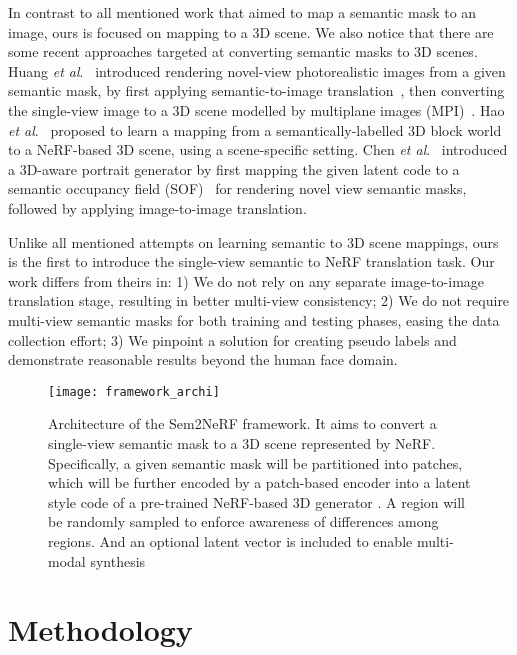 \documentclass[runningheads]{llncs}
\newcommand{\etal}{\textit{et al}.}
\begin{document}
In contrast to all mentioned work that aimed to map a semantic mask to an image, ours is focused on mapping to a 3D scene.
We also notice that there are some recent approaches targeted at converting semantic masks to 3D scenes. Huang \etal~\cite{huang2020semantic} introduced rendering novel-view photorealistic images from a given semantic mask, by first applying semantic-to-image translation~\cite{park2019semantic}, then converting the single-view image to a 3D scene modelled by multiplane images (MPI)~\cite{zhou2018stereo}.
Hao \etal~\cite{hao2021gancraft} proposed to learn a mapping from a semantically-labelled 3D block world to a NeRF-based 3D scene, using a scene-specific setting. Chen \etal~\cite{chen2022sofgan} introduced a 3D-aware portrait generator by first mapping the given latent code to a semantic occupancy field (SOF)~\cite{chen2019learning} for rendering novel view semantic masks, followed by applying image-to-image translation. 

Unlike all mentioned attempts on learning semantic to 3D scene mappings, ours is the first to introduce the single-view semantic to NeRF translation task. Our work differs from theirs in: 1) We do not rely on any separate image-to-image translation stage, resulting in better multi-view consistency; 2) We do not require multi-view semantic masks for both training and testing phases, easing the data collection effort; 3) We pinpoint a solution for creating pseudo labels and demonstrate reasonable results beyond the human face domain.  




\begin{figure}[t!]
    \centering
    \texttt{[image: framework\_archi]}
    \caption{Architecture of the Sem2NeRF framework. It aims to convert a single-view semantic mask to a 3D scene represented by NeRF. Specifically, a given semantic mask will be partitioned into patches, which will be further encoded by a patch-based encoder  into a latent style code  of a pre-trained NeRF-based 3D generator . A region  will be randomly sampled to enforce awareness of differences among regions. And an optional latent vector  is included to enable multi-modal synthesis
    }
    \label{fig:framework_archi}
\end{figure}

\section{Methodology}
\end{document}
